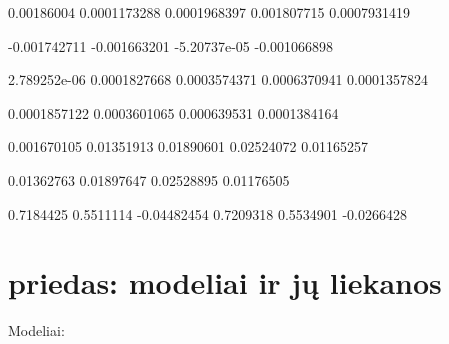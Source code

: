 \documentclass[12pt, a14paper, lithuanian]{article}
\begin{document}
\begin{Schunk}
\begin{Soutput}
           [,1]         [,2]         [,3]        [,4]         [,5]
[1,] 0.00186004 0.0001173288 0.0001968397 0.001807715 0.0007931419
\end{Soutput}
\begin{Soutput}
             [,1]         [,2]         [,3]         [,4]
[1,] -0.001742711 -0.001663201 -5.20737e-05 -0.001066898
\end{Soutput}
\begin{Soutput}
             [,1]         [,2]         [,3]         [,4]         [,5]
[1,] 2.789252e-06 0.0001827668 0.0003574371 0.0006370941 0.0001357824
\end{Soutput}
\begin{Soutput}
             [,1]         [,2]        [,3]         [,4]
[1,] 0.0001857122 0.0003601065 0.000639531 0.0001384164
\end{Soutput}
\begin{Soutput}
            [,1]       [,2]       [,3]       [,4]       [,5]
[1,] 0.001670105 0.01351913 0.01890601 0.02524072 0.01165257
\end{Soutput}
\begin{Soutput}
           [,1]       [,2]       [,3]       [,4]
[1,] 0.01362763 0.01897647 0.02528895 0.01176505
\end{Soutput}
\begin{Soutput}
          [,1]      [,2]        [,3]      [,4]      [,5]       [,6]
[1,] 0.7184425 0.5511114 -0.04482454 0.7209318 0.5534901 -0.0266428
\end{Soutput}
\end{Schunk}



\section{priedas: modeliai ir jų liekanos}
\label{B 1}
Modeliai:
\end{document}
